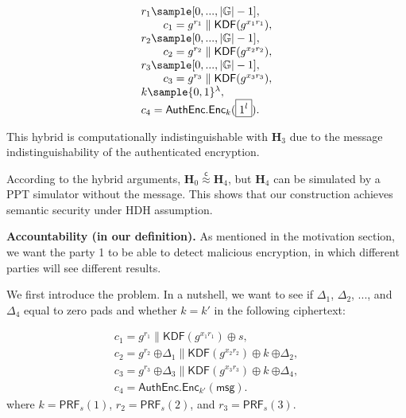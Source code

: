 \documentclass{article}
\begin{document}
\[
\begin{array}{l}
r_1\sample[0,...,|\mathbb{G}|-1],\\
\qquad c_1=g^{r_1}\parallel\mathsf{KDF}(g^{x_1r_1}),\\
r_2\sample[0,...,|\mathbb{G}|-1],\\
\qquad c_2=g^{r_2}\parallel\mathsf{KDF}(g^{x_2r_2}),\\
r_3\sample[0,...,|\mathbb{G}|-1],\\
\qquad c_3=g^{r_3}\parallel\mathsf{KDF}(g^{x_3r_3}),\\
k\sample\{0,1\}^\lambda,\\
c_4=\mathsf{AuthEnc}.\mathsf{Enc}_k(\boxed{1^l}).
\end{array}
\]

This hybrid is computationally indistinguishable with $\mathbf{H}_3$ due to the message indistinguishability of the authenticated encryption.

According to the hybrid arguments, $\mathbf{H}_0\stackrel{\mathsf{c}}{\approx}\mathbf{H}_4$, but $\mathbf{H}_4$ can be simulated by a PPT simulator without the message. This shows that our construction achieves semantic security under HDH assumption.

\smallskip
\noindent\textbf{Accountability (in our definition).} As mentioned in the motivation section, we want the party 1 to be able to detect malicious encryption, in which different parties will see different results.

We first introduce the problem. In a nutshell, we want to see if $\Delta_1$, $\Delta_2$, ..., and $\Delta_4$ equal to zero pads and whether $k=k'$ in the following ciphertext:

\[
\begin{array}{l}
c_1=g^{r_1}\parallel\mathsf{KDF}(g^{x_1r_1})\oplus s,\\
c_2=g^{r_2}~\boxed{\oplus\Delta_1}\parallel\mathsf{KDF}(g^{x_2r_2})\oplus k ~\boxed{\oplus\Delta_2,}\\
c_3=g^{r_3}~\boxed{\oplus\Delta_3}\parallel\mathsf{KDF}(g^{x_3r_3})\oplus k ~\boxed{\oplus\Delta_4,}\\
c_4=\mathsf{AuthEnc}.\mathsf{Enc}_{k'}(\mathsf{msg}).
\end{array}
\]
where $k=\mathsf{PRF}_s(1)$, $r_2=\mathsf{PRF}_s(2)$, and $r_3=\mathsf{PRF}_s(3)$.
\end{document}
